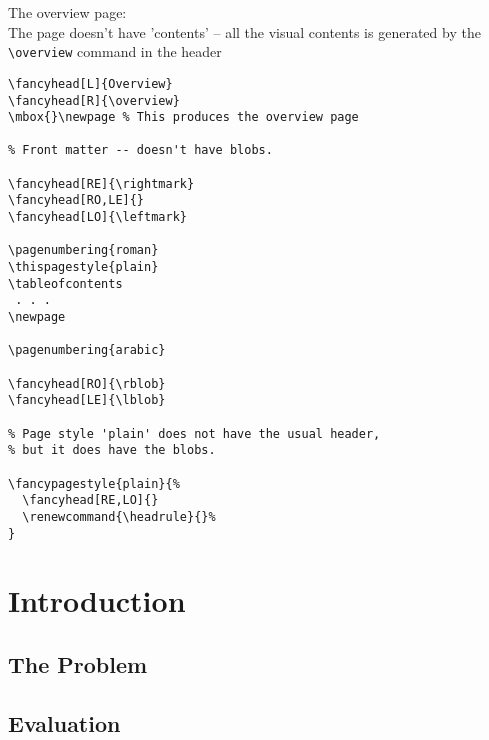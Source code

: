 \documentclass[twoside]{book}
\newcommand{\blob}{\rule[-.2\unitlength]{2\unitlength}{.5\unitlength}}
\newcommand\rblob{\thepage
  \begin{picture}(0,0)
    \put(1,-\value{chapter}){\blob}
  \end{picture}}
\newcommand\lblob{%
  \begin{picture}(0,0)
    \put(-3,-\value{chapter}){\blob}
  \end{picture}%
  \thepage}
\newcounter{line}
\newcommand{\chapname}[1]{\addtocounter{line}{1}%
  \put(1,-\value{line}){\blob}
  \put(-5.5,-\value{line}){\Large \arabic{line}}
  \put(-5,-\value{line}){\Large #1}}
\newcommand{\overview}{%
  \begin{picture}(0,0)
    \chapname{Introduction}
    \chapname{Another chapter}
    \chapname{Third case}
    \chapname{Fourth case}
    \chapname{Fifth case}
    \chapname{Sixth case}
    \chapname{Seventh case}
  \end{picture}}
\begin{document}
\noindent
\begin{boxedminipage}{\textwidth}
The overview page:\\
The page doesn't have 'contents' --
all the visual contents is generated
by the \verb|\overview| command in the header

\begin{verbatim}
\fancyhead[L]{Overview}
\fancyhead[R]{\overview}
\mbox{}\newpage % This produces the overview page

% Front matter -- doesn't have blobs.

\fancyhead[RE]{\rightmark}
\fancyhead[RO,LE]{}
\fancyhead[LO]{\leftmark}

\pagenumbering{roman}
\thispagestyle{plain}
\tableofcontents
 . . .
\newpage

\pagenumbering{arabic}

\fancyhead[RO]{\rblob}
\fancyhead[LE]{\lblob}

% Page style 'plain' does not have the usual header,
% but it does have the blobs.

\fancypagestyle{plain}{%
  \fancyhead[RE,LO]{}
  \renewcommand{\headrule}{}%
}
\end{verbatim}
\end{boxedminipage}

\newpage




\fancyhead[RO]{\rblob}
\fancyhead[LE]{\lblob}




\chapter{Introduction}

\lipsum[1-4]

\section{The Problem}
\label{sec:problem}

  \lipsum

\section{Evaluation}
\end{document}
